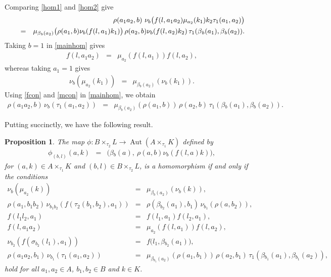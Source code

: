 \documentclass[11pt]{amsart}
\theoremstyle{thrm}
\theoremstyle{plain}
\newtheorem{prop}[thm]{Proposition}
\theoremstyle{definition}
\newcommand{\Aut}{\operatorname{Aut} }
\numberwithin{equation}{section}
\begin{document}
Comparing  \eqref{hom1} and \eqref{hom2} give
\begin{eqnarray}\label{mainhom}
&&\rho(a_1 a_2,b)~  \nu_b \big( f(l, a_1 a_2)\mu_{a_2}(k_1)k_2\tau_1(a_1, a_2) \big) \\
&=& \mu_{ \beta{_{b}(a_2)}} \big(\rho(a_1,b)   \nu_{b} (f(l,a_1)k_1)\big) \, \rho(a_2,b)  \nu_b(f(l,a_2) k_2)  \,\tau_1(\beta{_{b}(a_1)}, \beta{_{b}(a_2))}. \notag
\end{eqnarray}
Taking $b=1$ in \eqref{mainhom} gives
\begin{eqnarray}\label{fcon}
	f(l, a_1 a_2) &=& \mu_{ a_2}(f(l,a_1))f(l, a_2),
\end{eqnarray}
whereas taking $a_1=1$ gives
\begin{eqnarray}\label{mcon}
	\nu_b(\mu_{a_2}(k_1)) &=&   \mu_{ \beta{_{b}(a_2)}}( \nu_{b} (k_1)).
\end{eqnarray}
Using \eqref{fcon} and \eqref{mcon} in \eqref{mainhom}, we obtain
\begin{eqnarray}\label{rho second equation}
	\rho(a_1 a_2, b) \,\nu_{b}(\tau_1(a_1, a_2)) &=& \mu_{ \beta{_{b}(a_2)}}(\rho(a_1,b)) \,\rho(a_2, b) \, \tau_1(\beta{_{b}(a_1)}, \beta{_{b}(a_2)}).
\end{eqnarray}

Putting succinctly, we have the following result.

	\begin{prop}\label{phiallcondn}
		The map $\phi: B \times_{\tau_2} L \longrightarrow \Aut(A \times_{\tau_1} K )$ defined by
		\begin{eqnarray}\label{phidefnprop}
			\phi_{(b,l)}(a,k) &= & \big(\beta{_{b}(a)}, ~\rho(a,b)\nu_b(f(l,a)k)\big),
		\end{eqnarray} 
		for $(a,k) \in A \times_{\tau_1} K$ and $(b,l) \in B \times_{\tau_2} L$, is a homomorphism if and only if the conditions 
		\begin{eqnarray*}
			\nu_b(\mu_{a_2}(k)) & = &   \mu_{ \beta{_{b}(a_2)}}( \nu_{b} (k)),\\
			\rho(a_1, b_1 b_2) \,\nu_{b_1 b_2}( f(\tau_2(b_1, b_2), a_1)) &=& \rho(\beta{_{b_2}(a_1)}, b_1) \,\nu_{b_1}(\rho(a,b_2)),\\
			f(l_1l_2,a_1) &=& f( l_1, a_1)f( l_2,a_1),\\
			f(l, a_1 a_2) &=& \mu_{ a_2}(f(l,a_1))f(l, a_2),\\
			\nu_{b_2}(f(\sigma_{b_2}(l_1), a_1)) &=& f( l_1, \beta{_{b_2}(a_1))},\\
			\rho(a_1 a_2, b_1) \,\nu_{b_1}(\tau_1(a_1, a_2)) &=& \mu_{ \beta{_{b_1}(a_2)}}(\rho(a_1,b_1)) \,\rho(a_2, b_1) \, \tau_1(\beta{_{b_1}(a_1)}, \beta{_{b_1}(a_2)}),
		\end{eqnarray*} 
hold for all $a_1, a_2 \in A$, $b_1, b_2 \in B$ and $k \in K$.
\end{prop}
\end{document}
